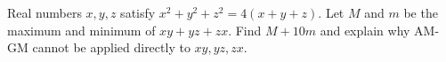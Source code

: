 Real numbers $x,y,z$ satisfy $x^2+y^2+z^2=4(x+y+z)$. Let $M$ and $m$ be the maximum and minimum of $xy+yz+zx$. Find $M+10m$ and explain why AM-GM cannot be applied directly to $xy,yz,zx$.
